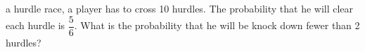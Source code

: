 \begin{enumerate}[label=\thechapter.\arabic*,ref=\thechapter.\theenumi]
\itemIn a hurdle race, a player has to cross 10 hurdles. The probability that he will clear each hurdle is $\dfrac{5}{6}$. What is the probability that he will be knock down fewer than 2 hurdles? 
\end{enumerate}
